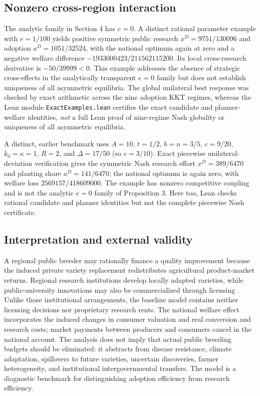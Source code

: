 \documentclass[11pt,a4paper]{article}
\begin{document}
\subsection{Nonzero cross-region interaction}
The analytic family in Section 4 has $e=0$. A distinct rational parameter example with $e=1/100$ yields positive symmetric public research $x^D=9751/130096$ and adoption $a^D=1051/32524$, with the national optimum again at zero and a negative welfare difference $-1933000423/211562115200$. Its local cross-research derivative is $-50/39999<0$. This example addresses the absence of strategic cross-effects in the analytically transparent $e=0$ family but does not establish uniqueness of all asymmetric equilibria. The global unilateral best response was checked by exact arithmetic across the nine adoption KKT regimes, whereas the Lean module \texttt{ExactExamples.lean} certifies the exact candidate and planner-welfare identities, \emph{not} a full Lean proof of nine-regime Nash globality or uniqueness of all asymmetric equilibria.

A distinct, earlier benchmark uses $A=10$, $t=1/2$, $b=n=3/5$, $c=9/20$, $k_0=\kappa=1$, $R=2$, and $\Delta=17/50$ (so $e=3/10$). Exact piecewise unilateral-deviation verification gives the symmetric Nash research effort $x^D=389/6470$ and planting share $a^D=141/6470$; the national optimum is again zero, with welfare loss $2569157/418609000$. The example has nonzero competitive coupling and is not the analytic $e=0$ family of Proposition 3. Here too, Lean checks rational candidate and planner identities but not the complete piecewise Nash certificate.

\subsection{Interpretation and external validity}
A regional public breeder may rationally finance a quality improvement because the induced private variety replacement redistributes agricultural product-market returns. Regional research institutions develop locally adapted varieties, while public-university innovations may also be commercialized through licensing \citep{oecd2019japan,akhundjanov2020apple}. Unlike those institutional arrangements, the baseline model contains neither licensing decisions nor proprietary research rents. The national welfare effect incorporates the induced changes in consumer valuation and real conversion and research costs; market payments between producers and consumers cancel in the national account. The analysis does not imply that actual public breeding budgets should be eliminated: it abstracts from disease resistance, climate adaptation, spillovers to future varieties, uncertain discoveries, farmer heterogeneity, and institutional intergovernmental transfers. The model is a diagnostic benchmark for distinguishing adoption efficiency from research efficiency.
\end{document}
